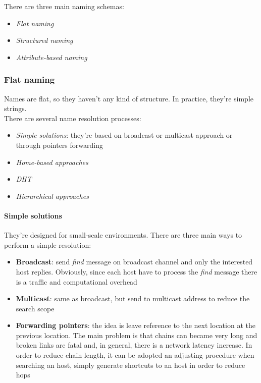 There are three main naming schemas:
\begin{itemize}
    \item \emph{Flat naming}
    \item \emph{Structured naming}
    \item \emph{Attribute-based naming}
\end{itemize}

\subsubsection{Flat naming}
Names are flat, so they haven't any kind of structure. In practice, they're simple strings.\\
There are several name resolution processes:
\begin{itemize}
    \item \textit{Simple solutions}: they're based on broadcast or multicast approach or
      through pointers forwarding
    \item \textit{Home-based approaches}
    \item \textit{DHT}
    \item \textit{Hierarchical approaches}
\end{itemize}

\paragraph{Simple solutions}

They're designed for small-scale environments. There are three main ways to perform a simple resolution:

\begin{itemize}
    \item
        \textbf{Broadcast}: send \emph{find} message on broadcast channel and only the interested host replies. Obviously, since each host have to process the \emph{find} message there is a traffic and computational overhead
    \item 
        \textbf{Multicast}: same as broadcast, but send to multicast address to reduce the search scope
    \item
        \textbf{Forwarding pointers}: the idea is leave reference to the next location at the previous location. The main problem is that chains can became very long and broken links are fatal and, in general, there is a network latency increase. In order to reduce chain length, it can be adopted an adjusting procedure when searching an host, simply generate shortcuts to an host in order to reduce hops
\end{itemize}

